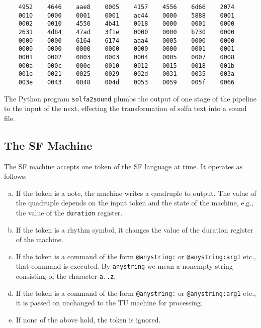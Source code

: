 \documentclass[11pt]{amsart}
\begin{document}
\begin{verbatim}
    4952    4646    aae8    0005    4157    4556    6d66    2074
    0010    0000    0001    0001    ac44    0000    5888    0001
    0002    0010    4550    4b41    0018    0000    0001    0000
    2631    4d84    47ad    3f1e    0000    0000    b730    0000
    0000    0000    6164    6174    aaa4    0005    0000    0000
    0000    0000    0000    0000    0000    0000    0001    0001
    0001    0002    0003    0003    0004    0005    0007    0008
    000a    000c    000e    0010    0012    0015    0018    001b
    001e    0021    0025    0029    002d    0031    0035    003a
    003e    0043    0048    004d    0053    0059    005f    0066
\end{verbatim}


The Python program {\tt solfa2sound} plumbs the output of one stage of the pipeline to the input of the next, effecting the transformation of solfa text into a sound file.



\subsection{The SF Machine}

The SF machine accepts one token of the SF language at time. It operates as follows:

\begin{enumerate}[(a)]

	\item If the token is a note, the machine writes a quadruple to output.  The value of the quadruple
	depends on the input token and the state of the machine, e.g., the value of the {\tt duration} register.
	
	\item If the token is a rhythm symbol, it changes the value of the duration register of the machine.
	
	\item If the token is a command of the form {\tt @anystring:} or 
	{\tt @anystring:arg1} etc., that command is executed.  By {\tt anystring} we mean 
	a nonempty string consisting of the character {\tt a..z}.
	
	\item If the token is a command of the form {\tt @anystring:} or {\tt @anystring:arg1} etc.,
	it is passed on unchanged to the TU machine for processing.
	
	\item If none of the above hold, the token is ignored.

\end{enumerate}
\end{document}
